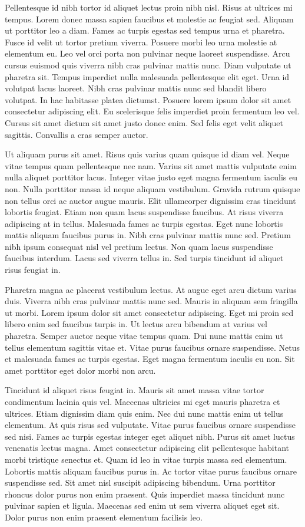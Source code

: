 \documentclass[11pt,a4paper]{article}
\begin{document}
Pellentesque id nibh tortor id aliquet lectus proin nibh nisl. Risus at ultrices mi tempus. Lorem donec massa sapien faucibus et molestie ac feugiat sed. Aliquam ut porttitor leo a diam. Fames ac turpis egestas sed tempus urna et pharetra. Fusce id velit ut tortor pretium viverra. Posuere morbi leo urna molestie at elementum eu. Leo vel orci porta non pulvinar neque laoreet suspendisse. Arcu cursus euismod quis viverra nibh cras pulvinar mattis nunc. Diam vulputate ut pharetra sit. Tempus imperdiet nulla malesuada pellentesque elit eget. Urna id volutpat lacus laoreet. Nibh cras pulvinar mattis nunc sed blandit libero volutpat. In hac habitasse platea dictumst. Posuere lorem ipsum dolor sit amet consectetur adipiscing elit. Eu scelerisque felis imperdiet proin fermentum leo vel. Cursus sit amet dictum sit amet justo donec enim. Sed felis eget velit aliquet sagittis. Convallis a cras semper auctor.

Ut aliquam purus sit amet. Risus quis varius quam quisque id diam vel. Neque vitae tempus quam pellentesque nec nam. Varius sit amet mattis vulputate enim nulla aliquet porttitor lacus. Integer vitae justo eget magna fermentum iaculis eu non. Nulla porttitor massa id neque aliquam vestibulum. Gravida rutrum quisque non tellus orci ac auctor augue mauris. Elit ullamcorper dignissim cras tincidunt lobortis feugiat. Etiam non quam lacus suspendisse faucibus. At risus viverra adipiscing at in tellus. Malesuada fames ac turpis egestas. Eget nunc lobortis mattis aliquam faucibus purus in. Nibh cras pulvinar mattis nunc sed. Pretium nibh ipsum consequat nisl vel pretium lectus. Non quam lacus suspendisse faucibus interdum. Lacus sed viverra tellus in. Sed turpis tincidunt id aliquet risus feugiat in.

Pharetra magna ac placerat vestibulum lectus. At augue eget arcu dictum varius duis. Viverra nibh cras pulvinar mattis nunc sed. Mauris in aliquam sem fringilla ut morbi. Lorem ipsum dolor sit amet consectetur adipiscing. Eget mi proin sed libero enim sed faucibus turpis in. Ut lectus arcu bibendum at varius vel pharetra. Semper auctor neque vitae tempus quam. Dui nunc mattis enim ut tellus elementum sagittis vitae et. Vitae purus faucibus ornare suspendisse. Netus et malesuada fames ac turpis egestas. Eget magna fermentum iaculis eu non. Sit amet porttitor eget dolor morbi non arcu.

Tincidunt id aliquet risus feugiat in. Mauris sit amet massa vitae tortor condimentum lacinia quis vel. Maecenas ultricies mi eget mauris pharetra et ultrices. Etiam dignissim diam quis enim. Nec dui nunc mattis enim ut tellus elementum. At quis risus sed vulputate. Vitae purus faucibus ornare suspendisse sed nisi. Fames ac turpis egestas integer eget aliquet nibh. Purus sit amet luctus venenatis lectus magna. Amet consectetur adipiscing elit pellentesque habitant morbi tristique senectus et. Quam id leo in vitae turpis massa sed elementum. Lobortis mattis aliquam faucibus purus in. Ac tortor vitae purus faucibus ornare suspendisse sed. Sit amet nisl suscipit adipiscing bibendum. Urna porttitor rhoncus dolor purus non enim praesent. Quis imperdiet massa tincidunt nunc pulvinar sapien et ligula. Maecenas sed enim ut sem viverra aliquet eget sit. Dolor purus non enim praesent elementum facilisis leo.
\end{document}
